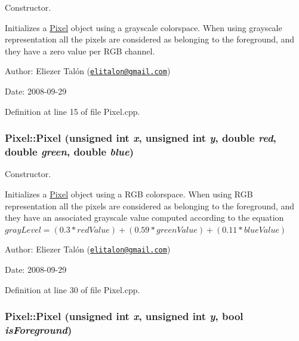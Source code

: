 Constructor. 

Initializes a \hyperlink{class_pixel}{Pixel} object using a grayscale colorspace. When using grayscale representation all the pixels are considered as belonging to the foreground, and they have a zero value per RGB channel.

\begin{Desc}
\item[Author:]Eliezer Talón (\href{mailto:elitalon@gmail.com}{\tt elitalon@gmail.com}) \end{Desc}
\begin{Desc}
\item[Date:]2008-09-29 \end{Desc}


Definition at line 15 of file Pixel.cpp.\hypertarget{class_pixel_e5ca1376e87442aea5968a17a4240814}{
\subsubsection[Pixel]{\setlength{\rightskip}{0pt plus 5cm}Pixel::Pixel (unsigned int {\em x}, \/  unsigned int {\em y}, \/  double {\em red}, \/  double {\em green}, \/  double {\em blue})}}
\label{class_pixel_e5ca1376e87442aea5968a17a4240814}


Constructor. 

Initializes a \hyperlink{class_pixel}{Pixel} object using a RGB colorspace. When using RGB representation all the pixels are considered as belonging to the foreground, and they have an associated grayscale value computed according to the equation $grayLevel = (0.3 * redValue) + (0.59 * greenValue) + (0.11 * blueValue) $

\begin{Desc}
\item[Author:]Eliezer Talón (\href{mailto:elitalon@gmail.com}{\tt elitalon@gmail.com}) \end{Desc}
\begin{Desc}
\item[Date:]2008-09-29 \end{Desc}


Definition at line 30 of file Pixel.cpp.\hypertarget{class_pixel_fcbda001fcad04f4166129f9195a65fa}{
\subsubsection[Pixel]{\setlength{\rightskip}{0pt plus 5cm}Pixel::Pixel (unsigned int {\em x}, \/  unsigned int {\em y}, \/  bool {\em isForeground})}}
\label{class_pixel_fcbda001fcad04f4166129f9195a65fa}


